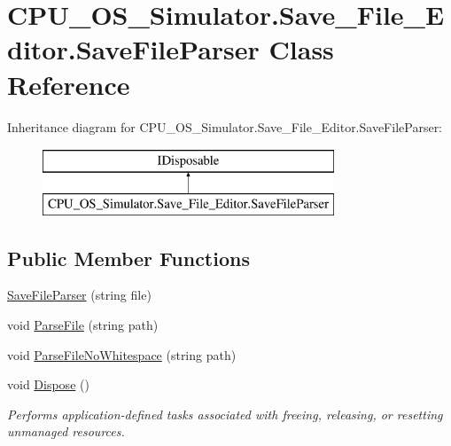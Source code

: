 \hypertarget{class_c_p_u___o_s___simulator_1_1_save___file___editor_1_1_save_file_parser}{}\section{C\+P\+U\+\_\+\+O\+S\+\_\+\+Simulator.\+Save\+\_\+\+File\+\_\+\+Editor.\+Save\+File\+Parser Class Reference}
\label{class_c_p_u___o_s___simulator_1_1_save___file___editor_1_1_save_file_parser}
Inheritance diagram for C\+P\+U\+\_\+\+O\+S\+\_\+\+Simulator.\+Save\+\_\+\+File\+\_\+\+Editor.\+Save\+File\+Parser\+:\begin{figure}[H]
\begin{center}
\leavevmode
\includegraphics[height=2.000000cm]{class_c_p_u___o_s___simulator_1_1_save___file___editor_1_1_save_file_parser}
\end{center}
\end{figure}
\subsection*{Public Member Functions}
\begin{DoxyCompactItemize}
\item 
\hyperlink{class_c_p_u___o_s___simulator_1_1_save___file___editor_1_1_save_file_parser_a65aa87bc19585e2000605ceb988c2c8b}{Save\+File\+Parser} (string file)
\item 
void \hyperlink{class_c_p_u___o_s___simulator_1_1_save___file___editor_1_1_save_file_parser_a2c4737d091b4be2e7ea7cd5c13dd500a}{Parse\+File} (string path)
\item 
void \hyperlink{class_c_p_u___o_s___simulator_1_1_save___file___editor_1_1_save_file_parser_a99fbbf56a2c81b54ca06529a0a981b17}{Parse\+File\+No\+Whitespace} (string path)
\item 
void \hyperlink{class_c_p_u___o_s___simulator_1_1_save___file___editor_1_1_save_file_parser_ac67b2c4ef9433395b274e8b9cc632143}{Dispose} ()
\begin{DoxyCompactList}\small\item\em Performs application-\/defined tasks associated with freeing, releasing, or resetting unmanaged resources. \end{DoxyCompactList}\end{DoxyCompactItemize}
